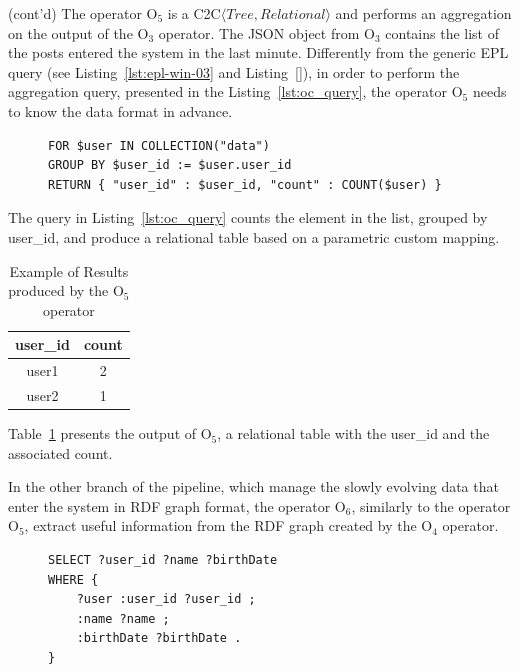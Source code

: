 \begin{Example}
(cont'd) The operator O$_5$ is a C2C$\langle Tree,Relational\rangle$ and performs an aggregation on the output of the O$_3$ operator. 
The JSON object from O$_3$ contains the list of the posts entered the system in the last minute.
Differently from the generic EPL query (see Listing~\ref{lst:epl-win-03} and Listing~\ref{}), in order to perform the aggregation query, presented in the Listing~\ref{lst:oc_query}, the operator O$_5$ needs to know the data format in advance.

\begin{figure}[ht]
\begin{minipage}{0.95\linewidth}
\begin{lstlisting}[caption={JSONiq Query for aggregating JSON element, applied by the operators O$_5$.},label=lst:oc_query,style=JSONIQ]
FOR $user IN COLLECTION("data")
GROUP BY $user_id := $user.user_id
RETURN { "user_id" : $user_id, "count" : COUNT($user) }
\end{lstlisting}
\end{minipage}
\end{figure}

The query in Listing~\ref{lst:oc_query} counts the element in the list, grouped by user\_id, and produce a relational table based on a parametric custom mapping. 

\begin{table}[ht]
\centering
\caption{Example of Results produced by the O$_5$ operator}
\label{tbl:oc_res}
    \begin{tabular}{|c|c|}
        \hline
        \textbf{user\_id} & \textbf{count} \\ \hline
        user1             & 2              \\ \hline
        user2             & 1              \\ \hline
    \end{tabular}
\end{table}

Table~\ref{tbl:oc_res} presents the output of O$_5$, a relational table with the user\_id and the associated count.

In the other branch of the pipeline, which manage the slowly evolving data that enter the system in RDF graph format, the operator O$_6$, similarly to the operator O$_5$, extract useful information from the RDF graph created by the O$_4$ operator. 

\begin{figure}[ht]
\begin{minipage}{0.95\linewidth}
\begin{lstlisting}[caption={SPAQL query applied by operator O$_6$ to the RDF stream to project information about the user.},label=lst:od_query,style=SPARQL]
SELECT ?user_id ?name ?birthDate
WHERE {
    ?user :user_id ?user_id ;
    :name ?name ;
    :birthDate ?birthDate .
} 
\end{lstlisting}
\end{minipage}
\end{figure}


\end{Example}
